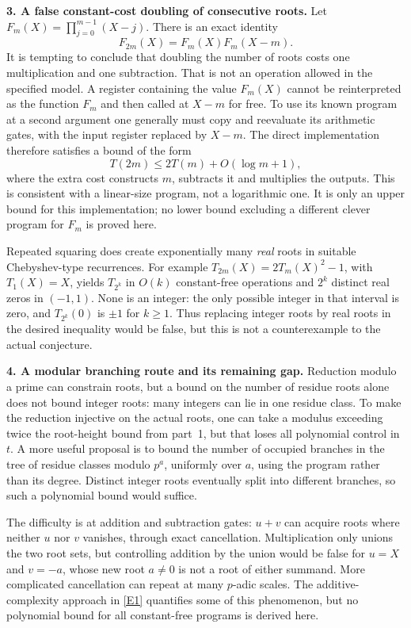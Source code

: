 \documentclass[11pt,a4paper]{article}
\newcommand{\eref}[2]{\hyperlink{extra:#1:#2}{[E#2]}}
\numberwithin{equation}{section}
\begin{document}
\textbf{3. A false constant-cost doubling of consecutive roots.}
Let $F_m(X)=\prod_{j=0}^{m-1}(X-j)$. There is an exact identity
\begin{equation}\label{20002353:falling}
 F_{2m}(X)=F_m(X)F_m(X-m).
\end{equation}
It is tempting to conclude that doubling the number of roots costs one
multiplication and one subtraction. That is not an operation allowed in
the specified model. A register containing the value $F_m(X)$ cannot be
reinterpreted as the function $F_m$ and then called at $X-m$ for free.
To use its known program at a second argument one generally must copy
and reevaluate its arithmetic gates, with the input register replaced by
$X-m$. The direct implementation therefore satisfies a bound of the form
\[
 T(2m)\le 2T(m)+O(\log m+1),
\]
where the extra cost constructs $m$, subtracts it and multiplies the
outputs. This is consistent with a linear-size program, not a logarithmic
one. It is only an upper bound for this implementation; no lower bound
excluding a different clever program for $F_m$ is proved here.

Repeated squaring does create exponentially many \emph{real} roots in
suitable Chebyshev-type recurrences. For example
$T_{2m}(X)=2T_m(X)^2-1$, with $T_1(X)=X$, yields $T_{2^k}$ in $O(k)$
constant-free operations and $2^k$ distinct real zeros in $(-1,1)$.
None is an integer: the only possible integer in that interval is zero,
and $T_{2^k}(0)$ is $\pm1$ for $k\ge1$. Thus replacing integer roots by
real roots in the desired inequality would be false, but this is not a
counterexample to the actual conjecture.

\textbf{4. A modular branching route and its remaining gap.}
Reduction modulo a prime can constrain roots, but a bound on the number
of residue roots alone does not bound integer roots: many integers can
lie in one residue class. To make the reduction injective on the actual
roots, one can take a modulus exceeding twice the root-height bound from
part~1, but that loses all polynomial control in $t$.
A more useful proposal is to bound the number of occupied branches in
the tree of residue classes modulo $p^a$, uniformly over $a$, using the
program rather than its degree. Distinct integer roots eventually split
into different branches, so such a polynomial bound would suffice.

The difficulty is at addition and subtraction gates: $u+v$ can acquire
roots where neither $u$ nor $v$ vanishes, through exact cancellation.
Multiplication only unions the two root sets, but controlling addition
by the union would be false for $u=X$ and $v=-a$, whose new root
$a\ne0$ is not a root
of either summand. More complicated cancellation can repeat at many
$p$-adic scales. The additive-complexity approach in \eref{20002353}{1}
quantifies some of this phenomenon, but no polynomial bound for all
constant-free programs is derived here.
\end{document}
